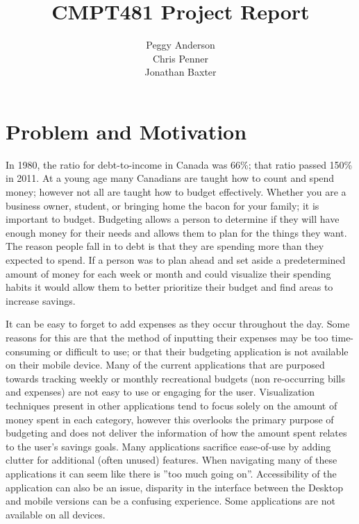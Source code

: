 \documentclass{chi2011}
\begin{document}
\setlength{\paperheight}{11in}
\setlength{\paperwidth}{8.5in}
\setlength{\pdfpageheight}{\paperheight}
\setlength{\pdfpagewidth}{\paperwidth}


\title{CMPT481 Project Report}
\author{
\alignauthor Peggy Anderson\\
    \alignauthor Chris Penner\\
    \alignauthor Jonathan Baxter\\
}

\maketitle

\section{Problem and Motivation}

In 1980, the ratio for debt-to-income in Canada was 66\%; that ratio passed
150\% in 2011. 
\autocite[1]{STATSCAN:1}
At a young age many Canadians are
taught how to count and spend money; however not all are taught how to budget
effectively. Whether you are a business owner, student, or bringing home the
bacon for your family; it is important to budget. Budgeting allows a person to
determine if they will have enough money for their needs and allows them to
plan for the things they want. The reason people fall in to debt is that they
are spending more than they expected to spend. If a person was to plan ahead
and set aside a predetermined amount of money for each week or month and could
visualize their spending habits it would allow them to better prioritize their
budget and find areas to increase savings.

It can be easy to forget to add expenses as they occur throughout the day.
Some reasons for this are that the method of inputting their expenses may be
too time-consuming or difficult to use; or that their budgeting application is
not available on their mobile device. Many of the current applications that
are purposed towards tracking weekly or monthly recreational budgets (non
re-occurring bills and expenses) are not easy to use or engaging for the user.
Visualization techniques present in other applications tend to focus solely
on the amount of money spent in each category, however this overlooks the
primary purpose of budgeting and does not deliver the information of how the
amount spent relates to the user's savings goals. Many applications sacrifice
ease-of-use by adding clutter for additional (often unused) features. When
navigating many of these applications it can seem like there is ”too much
going on”. Accessibility of the application can also be an issue, disparity
in the interface between the Desktop and mobile versions can be a confusing
experience. Some applications are not available on all devices.
\end{document}
